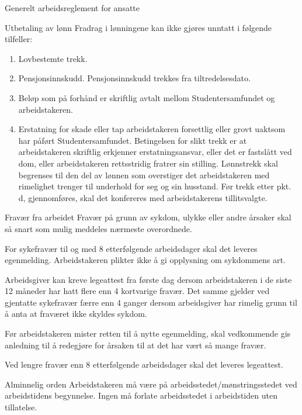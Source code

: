 \documentclass[fsbok.tex]{subfiles}
\begin{document}
\begin{lovkapittel}{Generelt arbeidsreglement for ansatte}
\begin{lovparagraf}{Utbetaling av lønn}
        Fradrag i lønningene kan ikke gjøres unntatt i følgende tilfeller:

        \begin{enumerate}
            \item Lovbestemte trekk.
            \item Pensjonsinnskudd. Pensjonsinnskudd trekkes fra tiltredelsesdato.
            \item Beløp som på forhånd er skriftlig avtalt mellom Studentersamfundet og arbeidstakeren.
            \item Erstatning for skade eller tap arbeidstakeren forsettlig eller grovt uaktsom har påført 
                Studentersamfundet. Betingelsen for slikt trekk er at arbeidstakeren skriftlig erkjenner 
                erstatningsansvar, eller det er fastslått ved dom, eller arbeidstakeren rettsstridig fratrer 
                sin stilling. Lønnstrekk skal begrenses til den del av lønnen som overstiger det arbeidstakeren 
                med rimelighet trenger til underhold for seg og sin husstand. Før trekk etter pkt. d, 
                gjennomføres, skal det konfereres med arbeidstakerens tillitsvalgte.  
        \end{enumerate} 
    \end{lovparagraf}

    \begin{lovparagraf}{Fravær fra arbeidet}
        Fravær på grunn av sykdom, ulykke eller andre årsaker skal så snart som mulig meddeles nærmeste overordnede.

        For sykefravær til og med 8 etterfølgende arbeidsdager skal det leveres egenmelding. Arbeidstakeren plikter ikke å gi
        opplysning om sykdommens art.

        Arbeidsgiver kan kreve legeattest fra første dag dersom arbeidstakeren i de siste 12 måneder har hatt flere enn 4
        kortvarige fravær. Det samme gjelder ved gjentatte sykefravær færre enn 4 ganger dersom arbeidsgiver har rimelig
        grunn til å anta at fraværet ikke skyldes sykdom.

        Før arbeidstakeren mister retten til å nytte egenmelding, skal vedkommende gis anledning til å redegjøre for årsaken
        til at det har vært så mange fravær.

        Ved lengre fravær enn 8 etterfølgende arbeidsdager skal det leveres legeattest. 
    \end{lovparagraf}

    \begin{lovparagraf}{Alminnelig orden}
        Arbeidstakeren må være på arbeidsstedet/mønstringsstedet ved arbeidstidens begynnelse.
        Ingen må forlate arbeidsstedet i arbeidstiden uten tillatelse.


\end{lovparagraf}
\end{lovkapittel}
\end{document}
